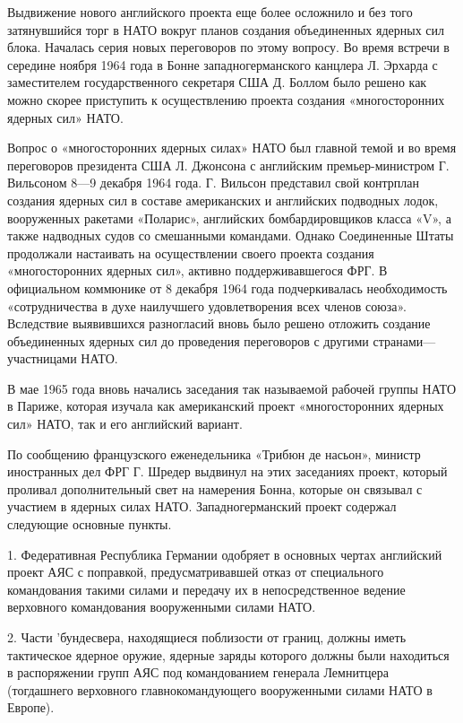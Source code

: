 \documentclass[12pt, a4paper, openany]{book}
\begin{document}
		Выдвижение нового английского проекта еще более осложнило и без того затянувшийся торг в НАТО вокруг планов создания объединенных ядерных сил блока. Началась серия новых переговоров по этому вопросу. Во время встречи в середине ноября 1964 года в Бонне западногерманского канцлера Л. Эрхарда с заместителем государственного секретаря США Д. Боллом было решено как можно скорее приступить к осуществлению проекта создания «многосторонних ядерных сил» НАТО.
		
		Вопрос о «многосторонних ядерных силах» НАТО был главной темой и во время переговоров президента США Л. Джонсона с английским премьер-министром Г. Вильсоном 8—9 декабря 1964 года. Г. Вильсон представил свой контрплан создания ядерных сил в составе американских и английских подводных лодок, вооруженных ракетами «Поларис», английских бомбардировщиков класса «V», а также надводных судов со смешанными командами. Однако Соединенные Штаты продолжали настаивать на осуществлении своего проекта создания «многосторонних ядерных сил», активно поддерживавшегося ФРГ. В официальном коммюнике от 8 декабря 1964 года подчеркивалась необходимость «сотрудничества в духе наилучшего удовлетворения всех членов союза». Вследствие выявившихся разногласий вновь было решено отложить создание объединенных ядерных сил до проведения переговоров с другими странами—участницами НАТО.
		
		В мае 1965 года вновь начались заседания так называемой рабочей группы НАТО в Париже, которая изучала как американский проект «многосторонних ядерных сил» НАТО, так и его английский вариант.
		
		По сообщению французского еженедельника «Трибюн де насьон», министр иностранных дел ФРГ Г. Шредер выдвинул на этих заседаниях проект, который проливал дополнительный свет на намерения Бонна, которые он связывал с участием в ядерных силах НАТО. Западногерманский проект содержал следующие основные пункты.
		
		1. Федеративная Республика Германии одобряет в основных чертах английский проект АЯС с поправкой, предусматривавшей отказ от специального командования такими силами и передачу их в непосредственное ведение верховного командования вооруженными силами НАТО.
		
		2. Части 'бундесвера, находящиеся поблизости от границ, должны иметь тактическое ядерное оружие, ядерные заряды которого должны были находиться в распоряжении групп АЯС под командованием генерала Лемнитцера (тогдашнего верховного главнокомандующего вооруженными силами НАТО в Европе).
		
\end{document}
